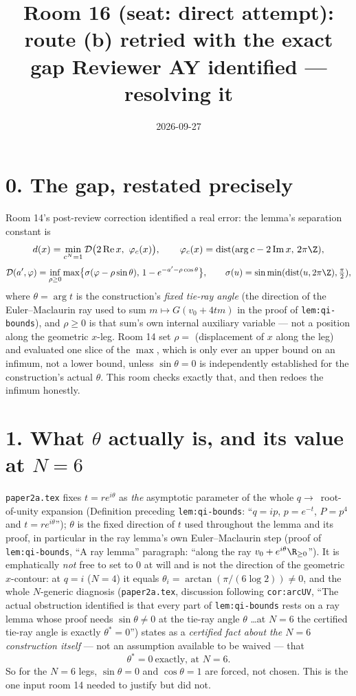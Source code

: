 \documentclass[11pt]{article}
\title{Room 16 (seat: direct attempt): route (b) retried with the exact gap
Reviewer AY identified --- resolving it}
\date{2026-09-27}
\begin{document}
\maketitle

\section*{0. The gap, restated precisely}

Room 14's post-review correction identified a real error: the lemma's separation constant is
\[
d(x)=\min_{c^N=1}\mathcal D\bigl(2\operatorname{Re}x,\ \varphi_c(x)\bigr),\qquad
\varphi_c(x)=\operatorname{dist}(\arg c-2\operatorname{Im}x,\,2\pi\Z),
\]
\[
\mathcal D(a',\varphi)=\inf_{\rho\ge0}\max\bigl\{\sigma(\varphi-\rho\sin\theta),\,1-e^{-a'-\rho\cos\theta}\bigr\},
\qquad \sigma(u)=\sin\min(\operatorname{dist}(u,2\pi\Z),\tfrac\pi2),
\]
where $\theta=\arg t$ is the construction's \emph{fixed tie-ray angle} (the direction of the
Euler--Maclaurin ray used to sum $m\mapsto G(v_0+4tm)$ in the proof of \texttt{lem:qi-bounds}), and
$\rho\ge0$ is that sum's own internal auxiliary variable --- not a position along the geometric
$x$-leg. Room 14 set $\rho=$ (displacement of $x$ along the leg) and evaluated one slice of the
$\max$, which is only ever an upper bound on an infimum, not a lower bound, unless $\sin\theta=0$
is independently established for the construction's actual $\theta$. This room checks exactly that,
and then redoes the infimum honestly.

\section*{1. What $\theta$ actually is, and its value at $N=6$}

\texttt{paper2a.tex} fixes $t=re^{i\theta}$ as \emph{the} asymptotic parameter of the whole
$q\to$~root-of-unity expansion (Definition preceding \texttt{lem:qi-bounds}: ``$q=ip$, $p=e^{-t}$,
$P=p^4$ and $t=re^{i\theta}$''); $\theta$ is the fixed direction of $t$ used throughout the lemma
and its proof, in particular in the ray lemma's own Euler--Maclaurin step (proof of
\texttt{lem:qi-bounds}, ``A ray lemma'' paragraph: ``along the ray $v_0+e^{i\theta}\R_{\ge0}$''). It
is emphatically \emph{not} free to set to $0$ at will and is not the direction of the geometric
$x$-contour: at $q=i$ ($N=4$) it equals $\theta_i=\arctan(\pi/(6\log2))\ne0$, and the whole
$N$-generic diagnosis (\texttt{paper2a.tex}, discussion following \texttt{cor:arcUV}, ``The actual
obstruction identified is that every part of \texttt{lem:qi-bounds} rests on a ray lemma whose proof
needs $\sin\theta\ne0$ at the tie-ray angle $\theta$ \ldots at $N=6$ the certified tie-ray angle is
exactly $\theta^\ast=0$'') states as a \emph{certified fact about the $N=6$ construction itself} ---
not an assumption available to be waived --- that
\[
\boxed{\theta^\ast=0\ \text{exactly, at }N=6.}
\]
So for the $N=6$ legs, $\sin\theta=0$ and $\cos\theta=1$ are forced, not chosen. This is the one
input room 14 needed to justify but did not.
\end{document}
